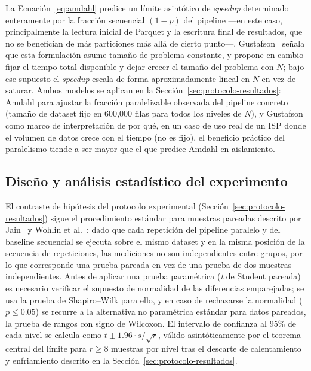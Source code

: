 \documentclass[11pt,letterpaper]{article}
\begin{document}
La Ecuación~\ref{eq:amdahl} predice un límite asintótico de \emph{speedup} determinado
enteramente por la fracción secuencial $(1-p)$ del pipeline —en este caso, principalmente la
lectura inicial de Parquet y la escritura final de resultados, que no se benefician de más
particiones más allá de cierto punto—. Gustafson~\cite{gustafson1988reevaluating} señala que esta
formulación asume tamaño de problema constante, y propone en cambio fijar el tiempo total
disponible y dejar crecer el tamaño del problema con $N$; bajo ese supuesto el \emph{speedup}
escala de forma aproximadamente lineal en $N$ en vez de saturar. Ambos modelos se aplican en la
Sección~\ref{sec:protocolo-resultados}: Amdahl para ajustar la fracción paralelizable observada
del pipeline concreto (tamaño de dataset fijo en 600{,}000 filas para todos los niveles de $N$),
y Gustafson como marco de interpretación de por qué, en un caso de uso real de un ISP donde el
volumen de datos crece con el tiempo (no es fijo), el beneficio práctico del paralelismo tiende a
ser mayor que el que predice Amdahl en aislamiento.

\subsection{Diseño y análisis estadístico del experimento}

El contraste de hipótesis del protocolo experimental (Sección~\ref{sec:protocolo-resultados})
sigue el procedimiento estándar para muestras pareadas descrito por Jain~\cite{jain1991art} y
Wohlin et al.~\cite{wohlin2012experimentation}: dado que cada repetición del pipeline paralelo y
del baseline secuencial se ejecuta sobre el mismo dataset y en la misma posición de la secuencia
de repeticiones, las mediciones no son independientes entre grupos, por lo que corresponde una
prueba pareada en vez de una prueba de dos muestras independientes. Antes de aplicar una prueba
paramétrica (\emph{t} de Student pareada) es necesario verificar el supuesto de normalidad de las
diferencias emparejadas; se usa la prueba de Shapiro–Wilk para ello, y en caso de rechazarse la
normalidad ($p \leq 0.05$) se recurre a la alternativa no paramétrica estándar para datos
pareados, la prueba de rangos con signo de Wilcoxon. El intervalo de confianza al 95\% de cada
nivel se calcula como $\bar{t} \pm 1.96 \cdot s/\sqrt{r}$, válido asintóticamente por el teorema
central del límite para $r \geq 8$ muestras por nivel tras el descarte de calentamiento y
enfriamiento descrito en la Sección~\ref{sec:protocolo-resultados}.
\end{document}
